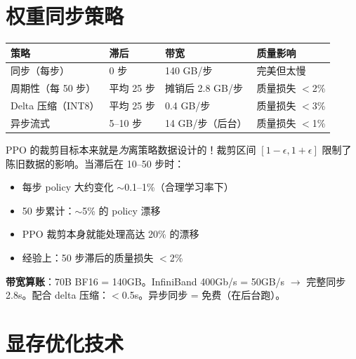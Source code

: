 \section{权重同步策略}
\label{weight-synchronization-strategies}

{\small
\noindent\begin{tabularx}{\linewidth}{@{}l l l Z{1}@{}}
\toprule
\textbf{策略} & \textbf{滞后} & \textbf{带宽} & \textbf{质量影响} \\
\midrule
同步（每步） & 0 步 & 140 GB/步 & 完美但太慢 \\
周期性（每 50 步） & 平均 25 步 & 摊销后 2.8 GB/步 & 质量损失 $<$2\% \\
Delta 压缩（INT8） & 平均 25 步 & 0.4 GB/步 & 质量损失 $<$3\% \\
异步流式 & 5--10 步 & 14 GB/步（后台） & 质量损失 $<$1\% \\
\bottomrule
\end{tabularx}
}

\begin{intuitionbox}
PPO 的裁剪目标本来就是\emph{为}离策略数据设计的！裁剪区间 $[1-\epsilon, 1+\epsilon]$ 限制了陈旧数据的影响。当滞后在 10--50 步时：

\begin{itemize}
  \item 每步 policy 大约变化 $\sim$0.1--1\%（合理学习率下）
  \item 50 步累计：$\sim$5\% 的 policy 漂移
  \item PPO 裁剪本身就能处理高达 20\% 的漂移
  \item 经验上：50 步滞后的质量损失 $<$2\%
\end{itemize}

\textbf{带宽算账}：70B BF16 = 140GB。InfiniBand 400Gb/s = 50GB/s $\rightarrow$ 完整同步 2.8s。配合 delta 压缩：$<$0.5s。异步同步 = 免费（在后台跑）。
\end{intuitionbox}

\section{显存优化技术}
\label{memory-optimization-techniques}

